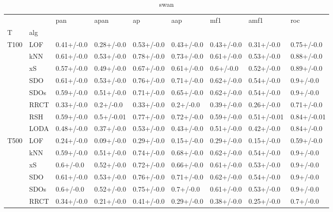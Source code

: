 \begin{table}
\centering
\caption{swan}
\begin{tabular}{lllllllll}
\toprule
      &      &         pan &        apan &          ap &         aap &         mf1 &         amf1 &          roc \\
T & alg &             &             &             &             &             &              &              \\
\midrule
T100 & LOF &  0.41+/-0.0 &  0.28+/-0.0 &  0.53+/-0.0 &  0.43+/-0.0 &  0.43+/-0.0 &   0.31+/-0.0 &   0.75+/-0.0 \\
      & kNN &  0.61+/-0.0 &  0.53+/-0.0 &  0.78+/-0.0 &  0.73+/-0.0 &  0.61+/-0.0 &   0.53+/-0.0 &   0.88+/-0.0 \\
      & xS &  0.57+/-0.0 &  0.49+/-0.0 &  0.67+/-0.0 &  0.61+/-0.0 &   0.6+/-0.0 &   0.52+/-0.0 &   0.89+/-0.0 \\
      & SDO &  0.61+/-0.0 &  0.53+/-0.0 &  0.76+/-0.0 &  0.71+/-0.0 &  0.62+/-0.0 &   0.54+/-0.0 &    0.9+/-0.0 \\
      & SDOs &  0.59+/-0.0 &  0.51+/-0.0 &  0.71+/-0.0 &  0.65+/-0.0 &  0.62+/-0.0 &   0.54+/-0.0 &    0.9+/-0.0 \\
      & RRCT &  0.33+/-0.0 &   0.2+/-0.0 &  0.33+/-0.0 &   0.2+/-0.0 &  0.39+/-0.0 &   0.26+/-0.0 &   0.71+/-0.0 \\
      & RSH &  0.59+/-0.0 &  0.5+/-0.01 &  0.77+/-0.0 &  0.72+/-0.0 &  0.59+/-0.0 &  0.51+/-0.01 &  0.84+/-0.01 \\
      & LODA &  0.48+/-0.0 &  0.37+/-0.0 &  0.53+/-0.0 &  0.43+/-0.0 &  0.51+/-0.0 &   0.42+/-0.0 &   0.84+/-0.0 \\
T500 & LOF &  0.24+/-0.0 &  0.09+/-0.0 &  0.29+/-0.0 &  0.15+/-0.0 &  0.29+/-0.0 &   0.15+/-0.0 &   0.59+/-0.0 \\
      & kNN &  0.59+/-0.0 &  0.51+/-0.0 &  0.74+/-0.0 &  0.68+/-0.0 &  0.62+/-0.0 &   0.54+/-0.0 &    0.9+/-0.0 \\
      & xS &   0.6+/-0.0 &  0.52+/-0.0 &  0.72+/-0.0 &  0.66+/-0.0 &  0.61+/-0.0 &   0.53+/-0.0 &    0.9+/-0.0 \\
      & SDO &  0.61+/-0.0 &  0.53+/-0.0 &  0.76+/-0.0 &  0.71+/-0.0 &  0.62+/-0.0 &   0.54+/-0.0 &    0.9+/-0.0 \\
      & SDOs &   0.6+/-0.0 &  0.52+/-0.0 &  0.75+/-0.0 &   0.7+/-0.0 &  0.61+/-0.0 &   0.53+/-0.0 &    0.9+/-0.0 \\
      & RRCT &  0.34+/-0.0 &  0.21+/-0.0 &  0.41+/-0.0 &  0.29+/-0.0 &  0.38+/-0.0 &   0.25+/-0.0 &    0.7+/-0.0 \\

\end{tabular}
\end{table}
